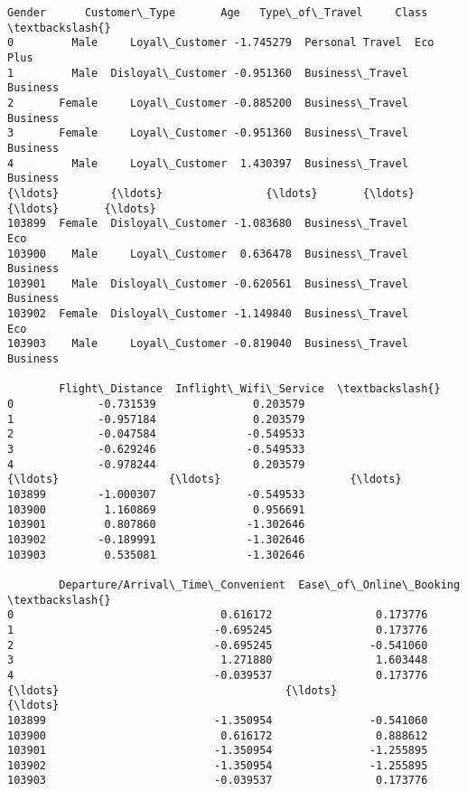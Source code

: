 \documentclass[11pt]{article}
\makeatletter
\newcommand{\boxspacing}{\kern\kvtcb@left@rule\kern\kvtcb@boxsep}
\newcommand{\prompt}[4]{
        {\ttfamily\llap{{\color{#2}[#3]:\hspace{3pt}#4}}\vspace{-\baselineskip}}
    }
\makeatother
\begin{document}
            \begin{tcolorbox}[breakable, size=fbox, boxrule=.5pt, pad at break*=1mm, opacityfill=0]
\prompt{Out}{outcolor}{15}{\boxspacing}
\begin{Verbatim}[commandchars=\\\{\}]
        Gender      Customer\_Type       Age   Type\_of\_Travel     Class  \textbackslash{}
0         Male     Loyal\_Customer -1.745279  Personal Travel  Eco Plus
1         Male  Disloyal\_Customer -0.951360  Business\_Travel  Business
2       Female     Loyal\_Customer -0.885200  Business\_Travel  Business
3       Female     Loyal\_Customer -0.951360  Business\_Travel  Business
4         Male     Loyal\_Customer  1.430397  Business\_Travel  Business
{\ldots}        {\ldots}                {\ldots}       {\ldots}              {\ldots}       {\ldots}
103899  Female  Disloyal\_Customer -1.083680  Business\_Travel       Eco
103900    Male     Loyal\_Customer  0.636478  Business\_Travel  Business
103901    Male  Disloyal\_Customer -0.620561  Business\_Travel  Business
103902  Female  Disloyal\_Customer -1.149840  Business\_Travel       Eco
103903    Male     Loyal\_Customer -0.819040  Business\_Travel  Business

        Flight\_Distance  Inflight\_Wifi\_Service  \textbackslash{}
0             -0.731539               0.203579
1             -0.957184               0.203579
2             -0.047584              -0.549533
3             -0.629246              -0.549533
4             -0.978244               0.203579
{\ldots}                 {\ldots}                    {\ldots}
103899        -1.000307              -0.549533
103900         1.160869               0.956691
103901         0.807860              -1.302646
103902        -0.189991              -1.302646
103903         0.535081              -1.302646

        Departure/Arrival\_Time\_Convenient  Ease\_of\_Online\_Booking  \textbackslash{}
0                                0.616172                0.173776
1                               -0.695245                0.173776
2                               -0.695245               -0.541060
3                                1.271880                1.603448
4                               -0.039537                0.173776
{\ldots}                                   {\ldots}                     {\ldots}
103899                          -1.350954               -0.541060
103900                           0.616172                0.888612
103901                          -1.350954               -1.255895
103902                          -1.350954               -1.255895
103903                          -0.039537                0.173776


\end{Verbatim}
\end{tcolorbox}
\end{document}
